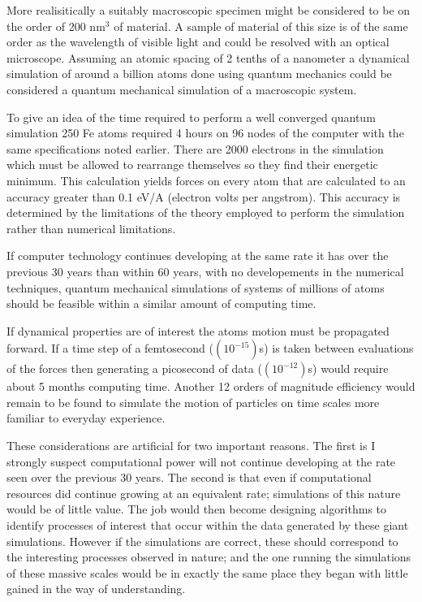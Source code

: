More realisitically a suitably macroscopic specimen might be considered to be on the 
order of 200 nm$^{3}$ of material. A sample of material of this size is of the 
same order as the wavelength of visible light and could be
resolved with an optical microscope. Assuming an atomic spacing of 2 tenths 
of a nanometer a dynamical simulation of around a billion atoms 
done using quantum mechanics could be considered a quantum mechanical 
simulation of a macroscopic system. 

To give an idea of the time required to perform a well converged quantum simulation 
250 Fe atoms required 4 hours on 96 nodes of the computer with the same 
specifications noted earlier. There are 2000 electrons in the 
simulation which must be allowed
to rearrange themselves so they find their energetic minimum. 
This calculation yields forces on every 
atom that are calculated to an accuracy greater 
than 0.1 eV/A (electron volts per angstrom).
This accuracy is determined by the limitations 
of the theory employed to perform the simulation
rather than numerical limitations.

If computer technology continues developing at the same rate it has
over the previous 30 years than within 60 years, with 
no developements in the numerical techniques, 
quantum mechanical simulations of systems of 
millions of atoms should be feasible within a 
similar amount of computing time. 

If dynamical properties are of interest the atoms 
motion must be propagated forward. 
If a time step of a femtosecond ($(10^{-15})$s) is taken 
between evaluations of the forces then generating 
a picosecond of data ($(10^{-12})$s) would require 
about 5 months computing time. Another 12 orders of magnitude 
efficiency would remain to be found to simulate the motion 
of particles on time scales more familiar to everyday experience.

These considerations are artificial for two important reasons. The first
is I strongly suspect computational power will not continue 
developing at the rate seen over the previous 30 years. 
The second is that even if computational resources did continue growing 
at an equivalent rate; simulations of this nature would be of little value.
The job would then become designing algorithms to identify 
processes of interest that occur within the data generated by these giant simulations.
However if the simulations are correct, these should correspond 
to the interesting processes observed in nature; and the one 
running the simulations of these massive scales would be in exactly 
the same place they began with little gained in the way of understanding.

